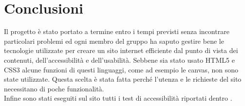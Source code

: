 \section{Conclusioni}
Il progetto è stato portato a termine entro i tempi previsti senza incontrare particolari problemi ed ogni membro del gruppo ha saputo gestire bene le tecnologie utilizzate per creare un sito internet efficiente dal punto di vista dei contenuti, dell'accessibilità e dell'usabilità. Sebbene sia stato usato HTML5 e CSS3 alcune funzioni di questi linguaggi, come ad esempio le canvas, non sono state utilizzate. Questa scelta è stata fatta perché l'utenza e le richieste del sito necessitano di poche funzionalità.\\
Infine sono stati eseguiti sul sito tutti i test di accessibilità riportati dentro .